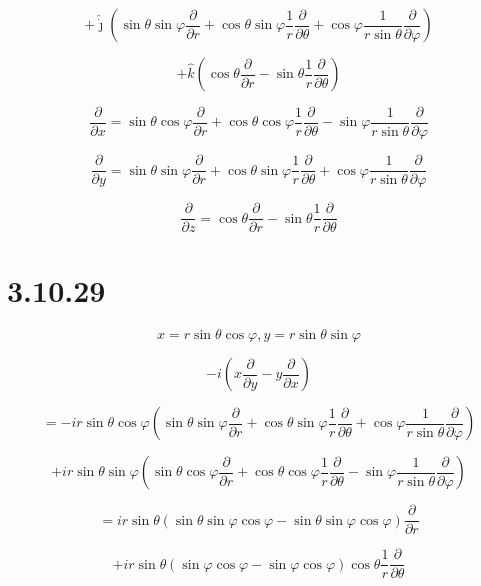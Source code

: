 \documentclass[12pt]{article}
\begin{document}
\[
    + \hat{\dot{\jmath}} \left(\sin{\theta} \sin{\varphi} \frac{\partial}{\partial r} + \cos{\theta} \sin{\varphi} \frac{1}{r} \frac{\partial}{\partial \theta} + \cos{\varphi} \frac{1}{r \sin{\theta}} \frac{\partial}{\partial \varphi} \right)
\]

\[
    + \hat{k} \left(\cos{\theta} \frac{\partial}{\partial r} - \sin{\theta} \frac{1}{r} \frac{\partial}{\partial \theta} \right)
\]

\[
    \frac{\partial}{\partial x} = \sin{\theta} \cos{\varphi} \frac{\partial}{\partial r} + \cos{\theta} \cos{\varphi} \frac{1}{r} \frac{\partial}{\partial \theta} - \sin{\varphi} \frac{1}{r \sin{\theta}} \frac{\partial}{\partial \varphi}
\]

\[
    \frac{\partial}{\partial y} = \sin{\theta} \sin{\varphi} \frac{\partial}{\partial r} + \cos{\theta} \sin{\varphi} \frac{1}{r} \frac{\partial}{\partial \theta} + \cos{\varphi} \frac{1}{r \sin{\theta}} \frac{\partial}{\partial \varphi}
\]

\[
    \frac{\partial}{\partial z} = \cos{\theta} \frac{\partial}{\partial r} - \sin{\theta} \frac{1}{r} \frac{\partial}{\partial \theta}
\]

\section{3.10.29}

\[
    x = r \sin{\theta} \cos{\varphi}, y = r \sin{\theta} \sin{\varphi}
\]

\[
    -i\left(x \frac{\partial}{\partial y} - y \frac{\partial}{\partial x}\right)
\]

\[
    = -i r \sin{\theta} \cos{\varphi} \left(\sin{\theta} \sin{\varphi} \frac{\partial}{\partial r} + \cos{\theta} \sin{\varphi} \frac{1}{r} \frac{\partial}{\partial \theta} + \cos{\varphi} \frac{1}{r \sin{\theta}} \frac{\partial}{\partial \varphi}\right)
\]

\[
    + i r \sin{\theta} \sin{\varphi} \left(\sin{\theta} \cos{\varphi} \frac{\partial}{\partial r} + \cos{\theta} \cos{\varphi} \frac{1}{r} \frac{\partial}{\partial \theta} - \sin{\varphi} \frac{1}{r \sin{\theta}} \frac{\partial}{\partial \varphi}\right)
\]

\[
    = i r \sin{\theta} \left(\sin{\theta} \sin{\varphi} \cos{\varphi} - \sin{\theta} \sin{\varphi} \cos{\varphi} \right) \frac{\partial}{\partial r}
\]

\[
    + i r \sin{\theta} \left(\sin{\varphi} \cos{\varphi} - \sin{\varphi} \cos{\varphi}\right) \cos{\theta} \frac{1}{r} \frac{\partial}{\partial \theta}
\]
\end{document}
